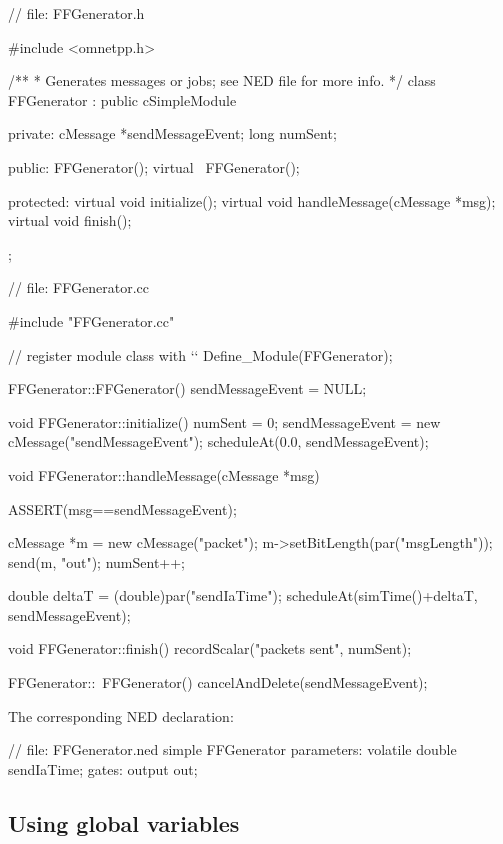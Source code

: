 \begin{cpp}
// file: FFGenerator.h

#include <omnetpp.h>

/**
 * Generates messages or jobs; see NED file for more info.
 */
class FFGenerator : public cSimpleModule
{
  private:
    cMessage *sendMessageEvent;
    long numSent;

  public:
    FFGenerator();
    virtual ~FFGenerator();

  protected:
    virtual void initialize();
    virtual void handleMessage(cMessage *msg);
    virtual void finish();
};
\end{cpp}

\begin{cpp}
// file: FFGenerator.cc

#include "FFGenerator.cc"

// register module class with `\opp`
Define_Module(FFGenerator);

FFGenerator::FFGenerator()
{
    sendMessageEvent = NULL;
}

void FFGenerator::initialize()
{
    numSent = 0;
    sendMessageEvent = new cMessage("sendMessageEvent");
    scheduleAt(0.0, sendMessageEvent);
}

void FFGenerator::handleMessage(cMessage *msg)
{
    ASSERT(msg==sendMessageEvent);

    cMessage *m = new cMessage("packet");
    m->setBitLength(par("msgLength"));
    send(m, "out");
    numSent++;

    double deltaT = (double)par("sendIaTime");
    scheduleAt(simTime()+deltaT, sendMessageEvent);
}

void FFGenerator::finish()
{
    recordScalar("packets sent", numSent);
}

FFGenerator::~FFGenerator()
{
    cancelAndDelete(sendMessageEvent);
}
\end{cpp}

The corresponding NED declaration:

\begin{ned}
// file: FFGenerator.ned
simple FFGenerator
{
    parameters:
        volatile double sendIaTime;
    gates:
        output out;
}
\end{ned}




\subsection{Using global variables}
\label{sec:simple-modules:global-vars}

